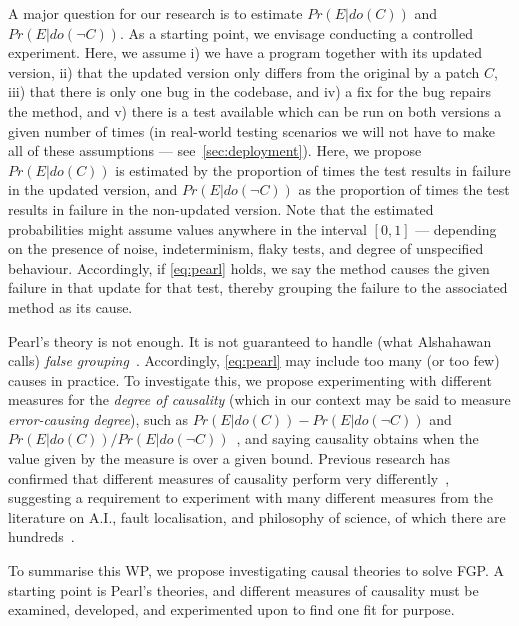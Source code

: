 A major question for our research is to estimate $Pr(E | do(C))$ and $ Pr(E |
do(\neg C))$. As a starting point, we envisage conducting a controlled experiment. Here, we assume i) we have a program together with its updated version, ii) that the updated version only differs from the original by a patch $C$, iii) that there is only one bug in the codebase, and iv) a fix for the bug repairs the method, and v) there is a test available  which can be run on both versions a given number of times  (in real-world testing scenarios we will not have to make all of these assumptions --- see~\autoref{sec:deployment}). Here, we propose $Pr(E|do(C))$  is estimated by the proportion of times the test results in failure in the updated version, and $Pr(E|do(\neg C))$  as the
proportion of times the test results in failure in the non-updated version. Note that the estimated probabilities might assume values anywhere in the interval $[0,1]$ --- depending on the presence of noise, indeterminism, flaky tests, and degree of unspecified behaviour. Accordingly, if \autoref{eq:pearl} holds, we say the method causes the given failure in that update for that test, thereby grouping the failure to the associated method as its cause. 

Pearl's theory is not enough. 
It is not guaranteed to handle (what Alshahawan calls) \textit{false grouping}~\cite{Facebook1}.
Accordingly, \autoref{eq:pearl} may include too many (or too few) causes in practice. To investigate this, we propose 
experimenting with different measures for the \textit{degree of causality} (which in our context may be said to measure \textit{error-causing degree}), such as $Pr(E | do(C)) - Pr(E | do(\neg C))$ and $Pr(E | do(C))/Pr(E | do(\neg C))$~\cite{pearl2009}, and saying causality obtains when the value given by the measure is over a given bound.  
Previous research has confirmed that different measures of causality perform very differently~\cite{eval}, suggesting a requirement to experiment with many different measures from the literature on A.I., fault localisation, and philosophy of science, of which there are hundreds~\cite{eval}.  

To summarise this WP, we propose investigating causal theories to solve FGP. A starting point is Pearl's theories, and different measures of causality must be examined, developed, and experimented upon to find one fit for purpose. 
